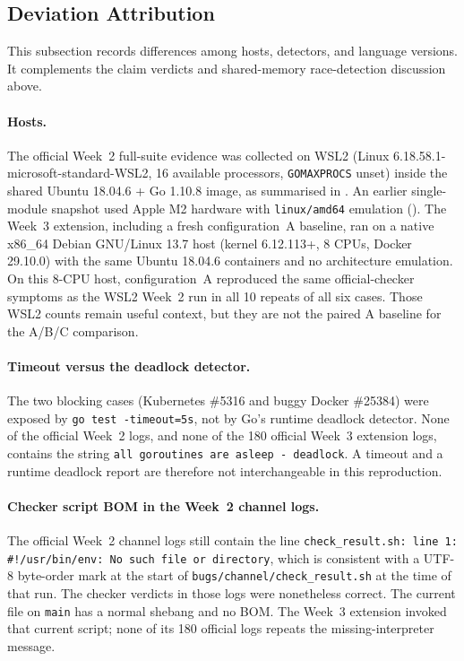 \subsection{Deviation Attribution}
\label{sec:deviation-attribution}

This subsection records differences among hosts, detectors, and language
versions. It complements the claim verdicts and shared-memory
race-detection discussion above.

\paragraph{Hosts.}
The official Week~2 full-suite evidence was collected on WSL2
(Linux 6.18.58.1-microsoft-standard-WSL2, 16 available processors,
\texttt{GOMAXPROCS} unset) inside the shared Ubuntu 18.04.6 + Go 1.10.8
image, as summarised in . An earlier single-module
snapshot used Apple M2 hardware with \texttt{linux/amd64} emulation
(). The Week~3 extension, including a fresh
configuration~A baseline, ran on a native x86\_64 Debian GNU/Linux 13.7
host (kernel 6.12.113+, 8 CPUs, Docker 29.10.0) with the same Ubuntu
18.04.6 containers and no architecture emulation. On this 8-CPU host,
configuration~A reproduced the same official-checker symptoms as the WSL2
Week~2 run in all 10 repeats of all six cases. Those WSL2 counts remain
useful context, but they are not the paired A baseline for the A/B/C
comparison.

\paragraph{Timeout versus the deadlock detector.}
The two blocking cases (Kubernetes \#5316 and buggy Docker \#25384) were
exposed by \texttt{go test -timeout=5s}, not by Go's runtime deadlock
detector. None of the official Week~2 logs, and none of the 180 official
Week~3 extension logs, contains the string
\texttt{all goroutines are asleep - deadlock}. A timeout and a runtime
deadlock report are therefore not interchangeable in this reproduction.

\paragraph{Checker script BOM in the Week~2 channel logs.}
The official Week~2 channel logs still contain the line
\texttt{check\_result.sh: line 1: \#!/usr/bin/env: No such file or directory},
which is consistent with a UTF-8 byte-order mark at the start of
\texttt{bugs/channel/check\_result.sh} at the time of that run. The checker
verdicts in those logs were nonetheless correct. The current file on
\texttt{main} has a normal shebang and no BOM. The Week~3 extension invoked
that current script; none of its 180 official logs repeats the missing-interpreter
message.

